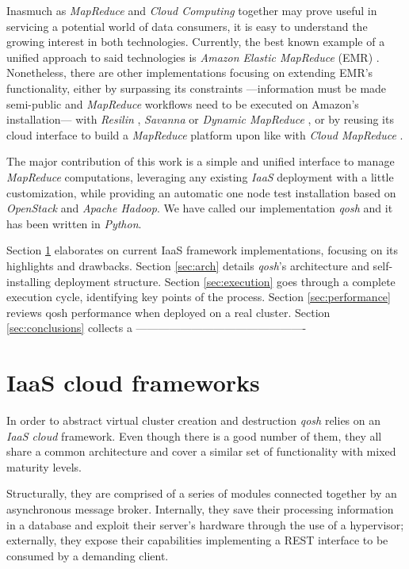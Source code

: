 \documentclass{sig-alternate}
\begin{document}
Inasmuch as \emph{MapReduce} and \emph{Cloud Computing} together may prove useful in servicing a potential world of data consumers, it is easy to understand the growing interest in both technologies. Currently, the best known example of a unified approach to said technologies is \emph{Amazon Elastic MapReduce} (EMR) \cite{emr:2013:online}. Nonetheless, there are other implementations focusing on extending EMR's functionality, either by surpassing its constraints ---information must be made semi-public and \emph{MapReduce} workflows need to be executed on Amazon's installation--- with \emph{Resilin} \cite{resilin}, \emph{Savanna} \cite{savanna:2013:online} or \emph{Dynamic MapReduce} \cite{dynamicmapreduce}, or by reusing its cloud interface to build a \emph{MapReduce} platform upon like with \emph{Cloud MapReduce} \cite{cloudmapreduce}.

The major contribution of this work is a simple and unified interface to manage \emph{MapReduce} computations, leveraging any existing \emph{IaaS} deployment with a little customization, while providing an automatic one node test installation based on \emph{OpenStack} and \emph{Apache Hadoop}. We have called our implementation \emph{qosh} and it has been written in \emph{Python}.

Section \ref{sec:frameworks} elaborates on current IaaS framework implementations, focusing on its highlights and drawbacks. Section \ref{sec:arch} details \emph{qosh}'s architecture and self-installing deployment structure. Section \ref{sec:execution} goes through a complete execution cycle, identifying key points of the process. Section \ref{sec:performance} reviews qosh performance when deployed on a real cluster. Section \ref{sec:conclusions} collects a  ----------------------------------------------



\section{IaaS cloud frameworks}\label{sec:frameworks}
\noindent In order to abstract virtual cluster creation and destruction \emph{qosh} relies on an \emph{IaaS cloud} framework. Even though there is a good number of them, they all share a common architecture and cover a similar set of functionality with mixed maturity levels.

Structurally, they are comprised of a series of modules connected together by an asynchronous message broker. Internally, they save their processing information in a database and exploit their server's hardware through the use of a hypervisor; externally, they expose their capabilities implementing a REST interface to be consumed by a demanding client.
\end{document}
